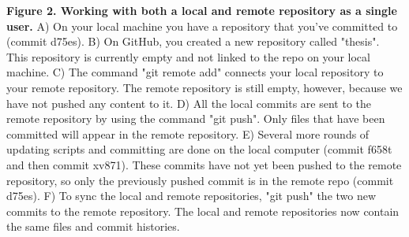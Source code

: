 \textbf{Figure 2. Working with both a local and remote repository as a single user.} A) On your local machine you have a repository that you've committed to (commit d75es). B) On GitHub, you created a new repository called "thesis". This repository is currently empty and not linked to the repo on your local machine. C) The command "git remote add" connects your local repository to your remote repository. The remote repository is still empty, however, because we have not pushed any content to it. D) All the local commits are sent to the remote repository by using the command "git push". Only files that have been committed will appear in the remote repository. E) Several more rounds of updating scripts and committing are done on the local computer (commit f658t and then commit xv871). These commits have not yet been pushed to the remote repository, so only the previously pushed commit is in the remote repo (commit d75es). F) To sync the local and remote repositories, "git push" the two new commits to the remote repository. The local and remote repositories now contain the same files and commit histories. 